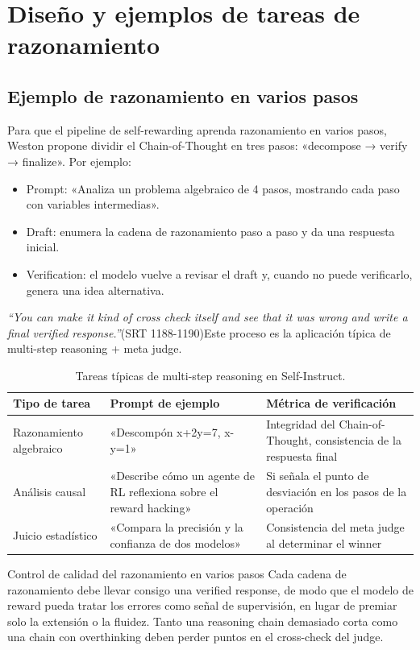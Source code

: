 \section{Diseño y ejemplos de tareas de razonamiento}
\subsection{Ejemplo de razonamiento en varios pasos}
Para que el pipeline de self-rewarding aprenda razonamiento en varios pasos, Weston propone dividir el Chain-of-Thought en tres pasos: «decompose → verify → finalize». Por ejemplo:
\begin{itemize}
    \item Prompt: «Analiza un problema algebraico de 4 pasos, mostrando cada paso con variables intermedias».
    \item Draft: enumera la cadena de razonamiento paso a paso y da una respuesta inicial.
    \item Verification: el modelo vuelve a revisar el draft y, cuando no puede verificarlo, genera una idea alternativa.
\end{itemize}
\textit{``You can make it kind of cross check itself and see that it was wrong and write a final verified response.''}(SRT 1188-1190)Este proceso es la aplicación típica de multi-step reasoning + meta judge.

\begin{table}[H]
\centering
\begin{tabular}{p{4cm}p{4cm}p{6cm}}
\toprule
Tipo de tarea & Prompt de ejemplo & Métrica de verificación \\
\midrule
Razonamiento algebraico & «Descompón x+2y=7, x-y=1» & Integridad del Chain-of-Thought, consistencia de la respuesta final \\
Análisis causal & «Describe cómo un agente de RL reflexiona sobre el reward hacking» & Si señala el punto de desviación en los pasos de la operación \\
Juicio estadístico & «Compara la precisión y la confianza de dos modelos» & Consistencia del meta judge al determinar el winner \\
\bottomrule
\end{tabular}
\caption{Tareas típicas de multi-step reasoning en Self-Instruct.}
\end{table}

\begin{knowledgebox}{Control de calidad del razonamiento en varios pasos}
Cada cadena de razonamiento debe llevar consigo una verified response, de modo que el modelo de reward pueda tratar los errores como señal de supervisión, en lugar de premiar solo la extensión o la fluidez. Tanto una reasoning chain demasiado corta como una chain con overthinking deben perder puntos en el cross-check del judge.
\end{knowledgebox}


